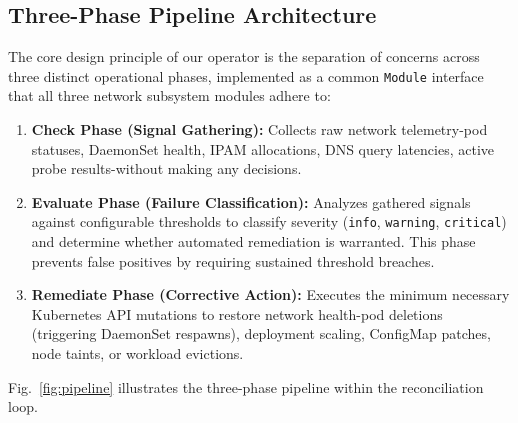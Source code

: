\documentclass[conference]{IEEEtran}
\begin{document}
\subsection{Three-Phase Pipeline Architecture}

The core design principle of our operator is the separation of concerns across three distinct operational phases, implemented as a common \texttt{Module} interface that all three network subsystem modules adhere to:

\begin{enumerate}
  \item \textbf{Check Phase (Signal Gathering):} Collects raw network telemetry-pod statuses, DaemonSet health, IPAM allocations, DNS query latencies, active probe results-without making any decisions.
  \item \textbf{Evaluate Phase (Failure Classification):} Analyzes gathered signals against configurable thresholds to classify severity (\texttt{info}, \texttt{warning}, \texttt{critical}) and determine whether automated remediation is warranted. This phase prevents false positives by requiring sustained threshold breaches.
  \item \textbf{Remediate Phase (Corrective Action):} Executes the minimum necessary Kubernetes API mutations to restore network health-pod deletions (triggering DaemonSet respawns), deployment scaling, ConfigMap patches, node taints, or workload evictions.
\end{enumerate}

Fig.~\ref{fig:pipeline} illustrates the three-phase pipeline within the reconciliation loop.
\end{document}
